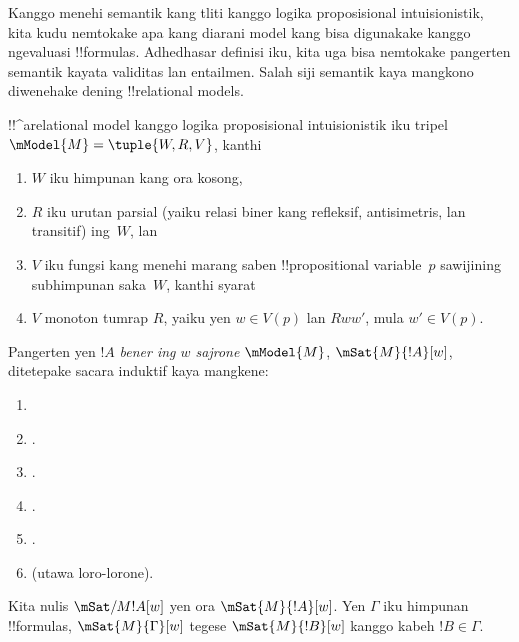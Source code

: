 \documentclass[../../../include/open-logic-section]{subfiles}
\begin{document}


Kanggo menehi semantik kang tliti kanggo logika proposisional
intuisionistik, kita kudu nemtokake apa kang diarani model kang bisa
digunakake kanggo ngevaluasi !!{formula}s. Adhedhasar definisi iku,
kita uga bisa nemtokake pangerten semantik kayata validitas lan
entailmen. Salah siji semantik kaya mangkono diwenehake dening
!!{relational model}s.

\begin{defn}
  !!^a{relational model} kanggo logika proposisional intuisionistik
  iku tripel $\mModel{M} = \tuple{W, R, V}$, kanthi
  \begin{enumerate}
  \item $W$ iku himpunan kang ora kosong,
  \item $R$ iku urutan parsial (yaiku relasi biner kang refleksif,
    antisimetris, lan transitif) ing~$W$, lan
  \item $V$ iku fungsi kang menehi marang saben !!{propositional
    variable}~$p$ sawijining subhimpunan saka~$W$, kanthi syarat
  \item $V$ monoton tumrap $R$, yaiku yen $w
    \in V(p)$ lan $Rww'$, mula $w' \in V(p)$.
  \end{enumerate}
\end{defn}

\begin{defn}
  Pangerten yen $!A$ \emph{bener ing $w$ sajrone
    $\mModel{M}$}, $\mSat{M}{!A}[w]$, ditetepake sacara induktif kaya mangkene:
  \begin{enumerate}
  \item {}
  \item {}.
  \item {}.
  \item {}.
  \item {}.
  \item {} (utawa loro-lorone).
  \end{enumerate}
  Kita nulis $\mSat/{M}{!A}[w]$ yen ora $\mSat{M}{!A}[w]$. Yen $\Gamma$
  iku himpunan !!{formula}s, $\mSat{M}{\Gamma}[w]$ tegese
  $\mSat{M}{!B}[w]$ kanggo kabeh $!B \in \Gamma$.
\end{defn}
\end{document}

